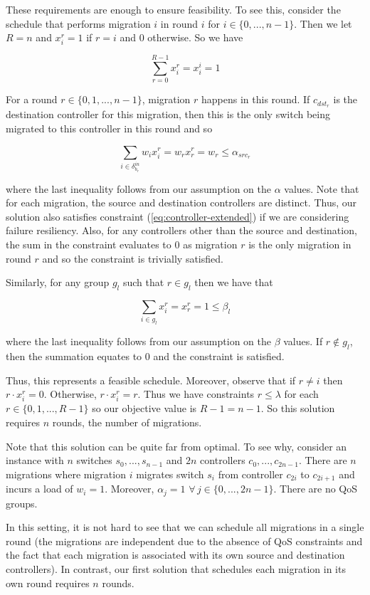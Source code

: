 \documentclass[conference]{IEEEtran}
\begin{document}
These requirements are enough to ensure feasibility. To see this, consider the schedule that performs migration $i$ in round $i$ for $i \in \{0, ..., n - 1\}$. Then we let $R = n$ and $x^{r}_{i} = 1$ if $r = i$ and 0 otherwise. So we have

$$\sum_{r=0}^{R-1} x^{r}_{i} = x^{i}_{i} = 1$$

For a round $r \in \{0, 1, ..., n - 1\}$, migration $r$ happens in this round. If $c_{dst_{r}}$ is the destination controller for this migration, then this is the only switch being migrated to this controller in this round and so

$$\sum_{i \in \delta^{in}_{b_{r}}} w_{i}x^{r}_{i} = w_{r}x^{r}_{r} = w_{r} \leq \alpha_{src_{r}}$$

where the last inequality follows from our assumption on the $\alpha$ values. Note that for each migration, the source and destination controllers are distinct. Thus, our solution also satisfies constraint (\ref{eq:controller-extended}) if we are considering failure resiliency. Also, for any controllers other than the source and destination, the sum in the constraint evaluates to 0 as migration $r$ is the only migration in round $r$ and so the constraint is trivially satisfied.

Similarly, for any group $g_{l}$ such that $r \in g_{l}$ then we have that

$$\sum_{i \in g_{l}} x^{r}_{i} = x^{r}_{r} = 1 \leq \beta_{l}$$

where the last inequality follows from our assumption on the $\beta$ values. If $r \notin g_{l}$, then the summation equates to 0 and the constraint is satisfied. 

Thus, this represents a feasible schedule. Moreover, observe that if $r \neq i$ then $r \cdot x^{r}_{i} = 0$. Otherwise, $r \cdot x^{r}_{i} = r$. Thus we have constraints $r \leq \lambda$ for each $r \in \{0, 1, ..., R - 1\}$ so our objective value is $R - 1 = n - 1$. So this solution requires $n$ rounds, the number of migrations.

Note that this solution can be quite far from optimal. To see why, consider an instance with $n$ switches $s_{0}, ..., s_{n-1}$ and $2n$ controllers $c_{0}, ..., c_{2n - 1}$. There are $n$ migrations where migration $i$ migrates switch $s_{i}$ from controller $c_{2i}$ to $c_{2i + 1}$ and incurs a load of $w_{i} = 1$. Moreover, $\alpha_{j} = 1$ $\forall \, j \in \{0, ..., 2n - 1\}$. There are no QoS groups.

In this setting, it is not hard to see that we can schedule all migrations in a single round (the migrations are independent due to the absence of QoS constraints and the fact that each migration is associated with its own source and destination controllers). In contrast, our first solution that schedules each migration in its own round requires $n$ rounds.
\end{document}
